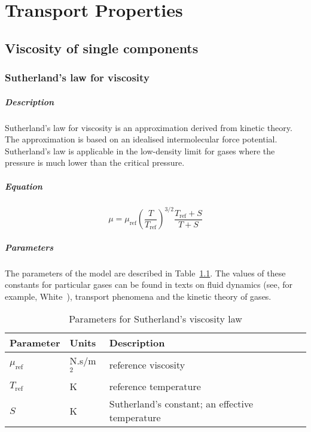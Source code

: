 \chapter{Transport Properties}
\label{chap:trans-prop}


\section{Viscosity of single components}

\subsection{Sutherland's law for viscosity}

\paragraph{Description}
Sutherland's law for viscosity is an approximation derived from kinetic theory.
The approximation is based on an idealised intermolecular force
potential.
Sutherland's law is applicable in the low-density limit for gases where
the pressure is much lower than the critical pressure.

\paragraph{Equation}

\begin{equation}
\mu = \mu_{\text{ref}} \left(\frac{T}{T_{\text{ref}}}\right)^{3/2} \frac{T_{\text{ref}} + S}{T + S}
\end{equation}

\paragraph{Parameters}
The parameters of the model are described in Table~\ref{tab:Suth-visc}.
The values of these constants for particular gases can be found in texts
on fluid dynamics (see, for example, White~\cite{white_2006}), transport phenomena and the kinetic theory of gases.

\begin{table}[h]
\caption{Parameters for Sutherland's viscosity law}
\label{tab:Suth-visc}
\begin{tabular}{llp{10cm}}
\toprule
Parameter        & Units     & Description \\ \midrule
$\mu_{\text{ref}}$ & N.s/m$^2$ & reference viscosity \\
$T_{\text{ref}}$   & K         & reference temperature  \\
$S$              & K         & Sutherland's constant; an effective temperature \\
\bottomrule
\end{tabular}
\end{table}

